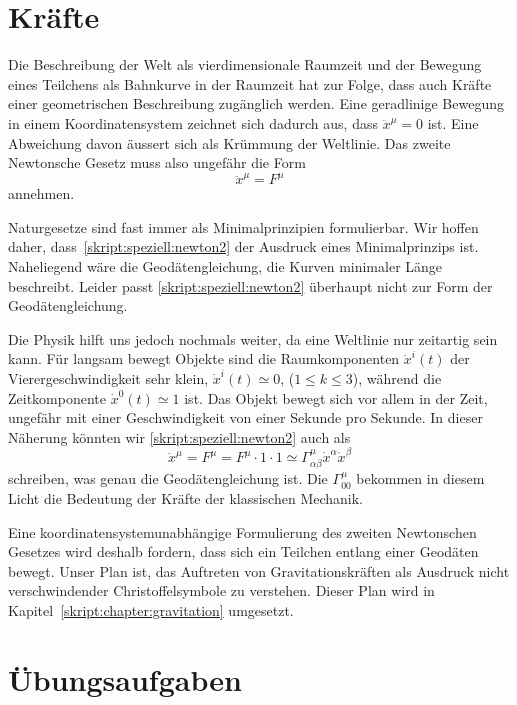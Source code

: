 \section{Kräfte}
Die Beschreibung der Welt als vierdimensionale Raumzeit und der Bewegung
eines Teilchens als Bahnkurve in der Raumzeit hat zur Folge, dass auch
Kräfte einer geometrischen Beschreibung zugänglich werden.
Eine geradlinige Bewegung in einem Koordinatensystem zeichnet sich
dadurch aus, dass $\ddot x^\mu=0$ ist.
Eine Abweichung davon äussert sich als Krümmung der Weltlinie.
Das zweite Newtonsche Gesetz muss also ungefähr die Form
\begin{equation}
\ddot x^\mu = F^\mu
\label{skript:speziell:newton2}
\end{equation}
annehmen.

Naturgesetze sind fast immer als Minimalprinzipien formulierbar.
Wir hoffen daher, dass~\eqref{skript:speziell:newton2} der Ausdruck
eines Minimalprinzips ist.
Naheliegend wäre die Geodätengleichung, die Kurven minimaler Länge 
beschreibt.
Leider passt \eqref{skript:speziell:newton2}
überhaupt nicht zur Form der Geodätengleichung.

Die Physik hilft uns jedoch nochmals weiter, da
eine Weltlinie nur zeitartig sein kann.
Für langsam bewegt Objekte sind die Raumkomponenten $\dot x^i(t)$
der Vierergeschwindigkeit sehr klein, $\dot x^i(t)\simeq 0$,
($1\le k\le 3$), während
die Zeitkomponente $\dot x^0(t)\simeq 1$ ist.
Das Objekt bewegt sich vor allem in der Zeit, ungefähr mit einer
Geschwindigkeit von einer Sekunde pro Sekunde.
In dieser Näherung könnten wir \eqref{skript:speziell:newton2}
auch als
\begin{equation}
\ddot x^\mu
=
F^\mu
=
F^\mu\cdot 1 \cdot 1
\simeq
\Gamma^\mu_{\alpha\beta}\dot x^\alpha\dot x^\beta
\end{equation}
schreiben, was genau die Geodätengleichung ist.
Die $\Gamma^\mu_{00}$ bekommen in diesem Licht die Bedeutung der 
Kräfte der klassischen Mechanik.

Eine koordinatensystemunabhängige Formulierung des zweiten Newtonschen
Gesetzes wird deshalb fordern, dass sich ein Teilchen entlang einer
Geodäten bewegt.
Unser Plan ist, das Auftreten von Gravitationskräften als
Ausdruck nicht verschwindender Christoffelsymbole zu verstehen.
Dieser Plan wird in Kapitel~\ref{skript:chapter:gravitation}
umgesetzt.


\section*{Übungsaufgaben}

